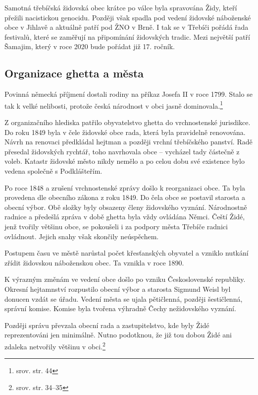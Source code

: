 \documentclass[a4paper,oneside,12pt]{report}
\begin{document}
Samotná třebíčská židovská obec krátce po válce byla spravována Židy, kteří přežili nacistickou genocidu.
Později však spadla pod vedení židovské náboženské obce v Jihlavě a aktuálně patří pod ŽNO v Brně.
I tak se v Třebíči pořádá řada festivalů, které se zaměřují na připomínání židovských tradic.
Mezi největší patří Šamajim, který v roce 2020 bude pořádat již 17. ročník.

\subsection{Organizace ghetta a města}

Povinná německá příjmení dostali rodiny na příkaz Josefa II v roce 1799.
Stalo se tak k velké nelibosti, protože česká národnost v obci jasně dominovala.\footnote{srov. \cite{Uhlir1978} str. 44}

Z organizačního hlediska patřilo obyvatelstvo ghetta do vrchnostenské jurisdikce.
Do roku 1849 byla v čele židovské obce rada, která byla pravidelně renovována.
Návrh na renovaci předkládal hejtman a později vrchní třebíčského panství.
Radě přesedal židovských rychtář, toho navrhovala obce -- vycházel tady částečně z voleb.
Katastr židovské město nikdy nemělo a po celou dobu své existence bylo vedena společně s Podklášteřím.

Po roce 1848 a zrušení vrchnostenské zprávy došlo k reorganizaci obce.
Ta byla provedena dle obecního zákona z roku 1849.
Do čela obce se postavil starosta a obecní výbor.
Obě složky byly obsazeny členy židovského vyznání.
Národnostně radnice a předešlá zpráva v době ghetta byla vždy ovládána Němci.
Čeští Židé, jenž tvořily většinu obce, se pokoušeli i za podpory města Třebíče radnici ovládnout.
Jejich snahy však skončily neúspěchem.

Postupem času ve městě narůstal počet křesťanských obyvatel a vzniklo nutkání zřídit židovskou náboženskou obec.
Ta vznikla v roce 1890.

K výrazným změnám ve vedení obce došlo po vzniku Československé republiky.
Okresní hejtamnství rozpustilo obecní výbor a starosta Sigmund Weisl byl donucen vzdát se úřadu.
Vedení města se ujala pětičlenná, později šestičlenná, správní komise.
Komise byla tvořena výhradně Čechy nežidovského vyznání.

Později správu převzala obecní rada a zastupitelstvo, kde byly Židé reprezentováni jen minimálně.
Nutno podotknou, že již tou dobou Židé ani zdaleka netvořily většinu v obci.\footnote{srov. \cite{Svobodva2015} str. 34--35}
\end{document}

